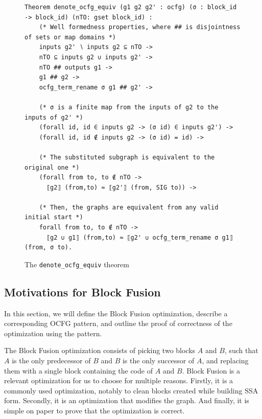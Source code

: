 \documentclass[11pt]{article}
\newcommand{\inlinecoq}[1]{\mbox{\lstinline[style=customcoq,columns=fixed,basewidth=.48em]{#1}}}
\newcommand{\ilc}[1]{\inlinecoq{#1}}
\newcommand{\ocfg}{OCFG\xspace}
\begin{document}


\begin{figure}
\begin{lstlisting}[style=customcoq,basicstyle=\small\ttfamily]
Theorem denote_ocfg_equiv (g1 g2 g2' : ocfg) (σ : block_id -> block_id) (nTO: gset block_id) :
    (* Well formedness properties, where ## is disjointness of sets or map domains *)
    inputs g2' ∖ inputs g2 ⊆ nTO -> 
    nTO ⊆ inputs g2 ∪ inputs g2' -> 
    nTO ## outputs g1 ->
    g1 ## g2 -> 
    ocfg_term_rename σ g1 ## g2' ->

    (* σ is a finite map from the inputs of g2 to the inputs of g2' *)
    (forall id, id ∈ inputs g2 -> (σ id) ∈ inputs g2') ->
    (forall id, id ∉ inputs g2 -> (σ id) = id) ->

    (* The substituted subgraph is equivalent to the original one *)
    (forall from to, to ∉ nTO -> 
      ⟦g2⟧ (from,to) ≈ ⟦g2'⟧ (from, SIG to)) ->

    (* Then, the graphs are equivalent from any valid initial start *)
    forall from to, to ∉ nTO ->
      ⟦g2 ∪ g1⟧ (from,to) ≈ ⟦g2' ∪ ocfg_term_rename σ g1⟧ (from, σ to).
  \end{lstlisting}
  \caption{The \ilc{denote_ocfg_equiv} theorem}
  \label{fig:ocfg_equiv}
\end{figure}

\subsection{Motivations for Block Fusion}

In this section, we will define the Block Fusion optimization, describe a corresponding \ocfg pattern, and outline the proof of correctness of the optimization using the pattern.

The Block Fusion optimization consists of picking two blocks $A$ and $B$,
such that $A$ is the only predecessor of $B$ and $B$ is the only successor of $A$,
and replacing them with a single block containing the code of $A$ and $B$.
%
Block Fusion is a relevant optimization for us to choose for multiple reasons. Firstly, it is a commonly used optimization, notably to clean blocks created while building SSA form. Secondly, it is an optimization that modifies the graph. And finally, it is simple on paper to prove that the optimization is correct.
\end{document}
